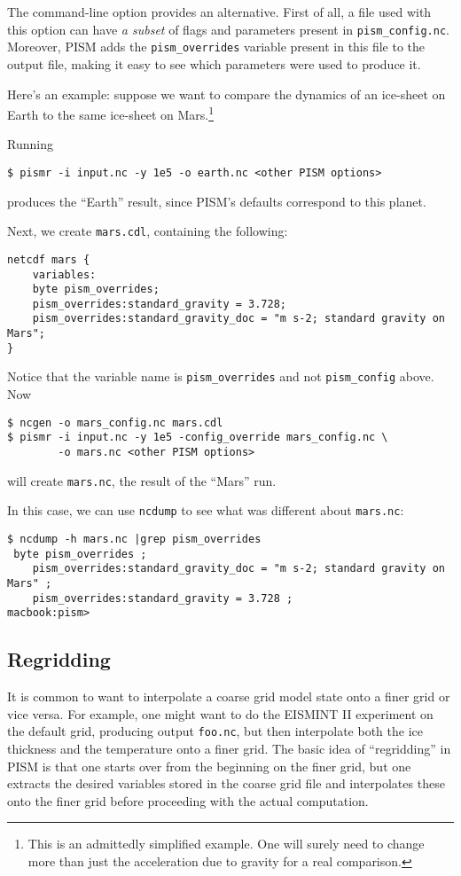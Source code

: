The  command-line option provides an alternative. First of all, a file used with this option can have \emph{a subset} of flags and parameters present in \texttt{pism_config.nc}. Moreover, PISM adds the \texttt{pism_overrides} variable present in this file to the output file, making it easy to see which parameters were used to produce it.

Here's an example: suppose we want to compare the dynamics of an ice-sheet on Earth to the same ice-sheet on Mars.\footnote{This is an admittedly simplified example. One will surely need to change more than just the acceleration due to gravity for a real comparison.}

Running
\begin{verbatim}
$ pismr -i input.nc -y 1e5 -o earth.nc <other PISM options>
\end{verbatim}
produces the ``Earth'' result, since PISM's defaults correspond to this planet.

Next, we create \texttt{mars.cdl}, containing the following:
\small
\begin{verbatim}
netcdf mars {
    variables:
    byte pism_overrides;
    pism_overrides:standard_gravity = 3.728;
    pism_overrides:standard_gravity_doc = "m s-2; standard gravity on Mars";
}
\end{verbatim}
\normalsize
Notice that the variable name is \texttt{pism_overrides} and not \texttt{pism_config} above. Now
\begin{verbatim}
$ ncgen -o mars_config.nc mars.cdl
$ pismr -i input.nc -y 1e5 -config_override mars_config.nc \
        -o mars.nc <other PISM options>
\end{verbatim}
will create \texttt{mars.nc}, the result of the ``Mars'' run.

In this case, we can use \texttt{ncdump} to see what was different about \texttt{mars.nc}:
\small
\begin{verbatim}
$ ncdump -h mars.nc |grep pism_overrides
 byte pism_overrides ;
    pism_overrides:standard_gravity_doc = "m s-2; standard gravity on Mars" ;
    pism_overrides:standard_gravity = 3.728 ;
macbook:pism>
\end{verbatim}
\normalsize

\subsection{Regridding}
\label{sec:regridding}

It is common to want to interpolate a coarse grid model state onto a finer grid or vice versa.  For example, one might want to do the EISMINT II experiment on the default grid, producing output \texttt{foo.nc}, but then interpolate both the ice thickness and the temperature onto a finer grid.  The basic idea of ``regridding'' in PISM is that one starts over from the beginning on the finer grid, but one extracts the desired variables stored in the coarse grid file and interpolates these onto the finer grid before proceeding with the actual computation.

